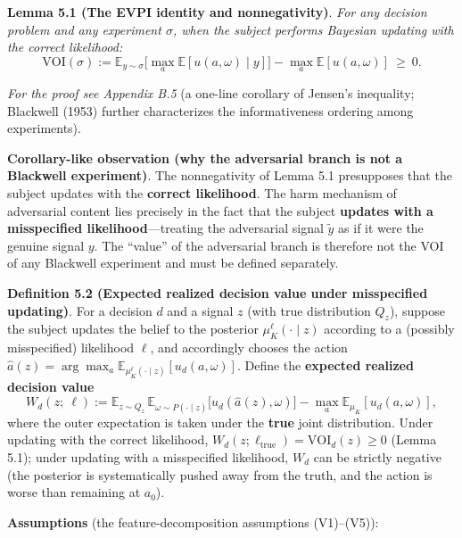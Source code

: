 \documentclass[
  11pt]{article}
\begin{document}
\textbf{Lemma 5.1 (The EVPI identity and nonnegativity)}. \emph{For any
decision problem and any experiment \(\sigma\), when the subject
performs Bayesian updating with the correct likelihood:}
\[\mathrm{VOI}(\sigma) := \mathbb{E}_{y \sim \sigma}\Big[\max_a \mathbb{E}[u(a,\omega) \mid y]\Big] - \max_a \mathbb{E}[u(a,\omega)] \ \ge\ 0.\]

\emph{For the proof see Appendix B.5} (a one-line corollary of Jensen's
inequality; Blackwell (1953) further characterizes the informativeness
ordering among experiments).

\textbf{Corollary-like observation (why the adversarial branch is not a
Blackwell experiment)}. The nonnegativity of Lemma 5.1 presupposes that
the subject updates with the \textbf{correct likelihood}. The harm
mechanism of adversarial content lies precisely in the fact that the
subject \textbf{updates with a misspecified likelihood}---treating the
adversarial signal \(\tilde y\) as if it were the genuine signal \(y\).
The ``value'' of the adversarial branch is therefore not the VOI of any
Blackwell experiment and must be defined separately.

\textbf{Definition 5.2 (Expected realized decision value under
misspecified updating)}. For a decision \(d\) and a signal \(z\) (with
true distribution \(Q_z\)), suppose the subject updates the belief to
the posterior \(\mu_K^{\ell}(\cdot \mid z)\) according to a (possibly
misspecified) likelihood \(\ell\), and accordingly chooses the action
\(\hat a(z) = \arg\max_a \mathbb{E}_{\mu_K^{\ell}(\cdot\mid z)}[u_d(a,\omega)]\).
Define the \textbf{expected realized decision value}
\[W_d(z;\ \ell) := \mathbb{E}_{z \sim Q_z}\,\mathbb{E}_{\omega \sim P(\cdot \mid z)}\big[u_d(\hat a(z), \omega)\big] - \max_a \mathbb{E}_{\mu_K}[u_d(a,\omega)],\]
where the outer expectation is taken under the \textbf{true} joint
distribution. Under updating with the correct likelihood,
\(W_d(z;\ell_{\mathrm{true}}) = \mathrm{VOI}_d(z) \ge 0\) (Lemma 5.1);
under updating with a misspecified likelihood, \(W_d\) can be strictly
negative (the posterior is systematically pushed away from the truth,
and the action is worse than remaining at \(a_0\)).

\textbf{Assumptions} (the feature-decomposition assumptions (V1)--(V5)):
\end{document}
